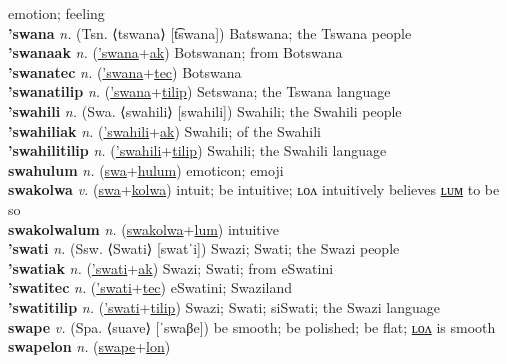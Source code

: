 emotion; feeling \label{swalum} \\
\textbf{'swana} \textit{n.} (Tsn. ⟨tswana⟩ [t͡swana])
Batswana; the Tswana people \label{'swana} \\
\textbf{'swanaak} \textit{n.} (\hyperref['swana]{'swana}+\hyperref[ak]{ak})
Botswanan; from Botswana \label{'swanaak} \\
\textbf{'swanatec} \textit{n.} (\hyperref['swana]{'swana}+\hyperref[tec]{tec})
Botswana \label{'swanatec} \\
\textbf{'swanatilip} \textit{n.} (\hyperref['swana]{'swana}+\hyperref[tilip]{tilip})
Setswana; the Tswana language \label{'swanatilip} \\
\textbf{'swahili} \textit{n.} (Swa. ⟨swahili⟩ [swahili])
Swahili; the Swahili people \label{'swahili} \\
\textbf{'swahiliak} \textit{n.} (\hyperref['swahili]{'swahili}+\hyperref[ak]{ak})
Swahili; of the Swahili \label{'swahiliak} \\
\textbf{'swahilitilip} \textit{n.} (\hyperref['swahili]{'swahili}+\hyperref[tilip]{tilip})
Swahili; the Swahili language \label{'swahilitilip} \\
\textbf{swahulum} \textit{n.} (\hyperref[swa]{swa}+\hyperref[hulum]{hulum})
emoticon; emoji \label{swahulum} \\
\textbf{swakolwa} \textit{v.} (\hyperref[swa]{swa}+\hyperref[kolwa]{kolwa})
intuit; be intuitive; ʟᴏᴧ intuitively believes \hyperref[swakolwalum]{ʟᴜᴍ} to be so \label{swakolwa} \\
\textbf{swakolwalum} \textit{n.} (\hyperref[swakolwa]{swakolwa}+\hyperref[lum]{lum})
intuitive \label{swakolwalum} \\
\textbf{'swati} \textit{n.} (Ssw. ⟨Swati⟩ [swatˈi])
Swazi; Swati; the Swazi people \label{'swati} \\
\textbf{'swatiak} \textit{n.} (\hyperref['swati]{'swati}+\hyperref[ak]{ak})
Swazi; Swati; from eSwatini \label{'swatiak} \\
\textbf{'swatitec} \textit{n.} (\hyperref['swati]{'swati}+\hyperref[tec]{tec})
eSwatini; Swaziland \label{'swatitec} \\
\textbf{'swatitilip} \textit{n.} (\hyperref['swati]{'swati}+\hyperref[tilip]{tilip})
Swazi; Swati; siSwati; the Swazi language \label{'swatitilip} \\
\textbf{swape} \textit{v.} (Spa. ⟨suave⟩ [ˈswaβe])
be smooth; be polished; be flat; \hyperref[swapelon]{ʟᴏᴧ} is smooth \label{swape} \\
\textbf{swapelon} \textit{n.} (\hyperref[swape]{swape}+\hyperref[lon]{lon})
